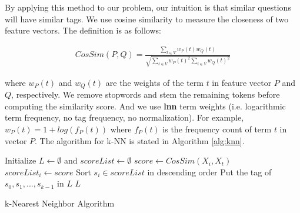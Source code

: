 By applying this method to our problem, our intuition is that similar questions will have similar tags. We use cosine similarity to measure the closeness of two feature vectors. The definition is as follows:

\begin{gather}
	CosSim(P,Q)=\frac{\sum_{t \in V}w_P(t)w_Q(t)}{\sqrt{\sum_{t \in V}w_P(t)^2 \sum_{t \in V}w_Q(t)^2}}
\end{gather}

where $w_P(t)$ and $w_Q(t)$ are the weights of the term $t$ in feature vector $P$ and $Q$, respectively. We remove stopwords and stem the remaining tokens before computing the similarity score. And we use \textbf{lnn} term weights (i.e. logarithmic term frequency, no tag frequency, no normalization). For example, $w_P(t) = 1 + log(f_P(t))$ where $f_P(t)$ is the frequency count of term $t$ in vector $P$. The algorithm for k-NN is stated in Algorithm \ref{alg:knn}.

\IncMargin{1em}
\begin{algorithm}
\label{alg:knn}
\BlankLine
Initialize $L \leftarrow \emptyset$ and $scoreList \leftarrow \emptyset$\;
 {
	$score \leftarrow CosSim(X_i, X_t)$ \;
	$scoreList_i \leftarrow score$ \;
}
Sort $s_i \in scoreList$ in descending order \; 
Put the tag of $s_0, s_1, ..., s_{k-1}$ in $L$ \;
\Return $L$\;
\caption{k-Nearest Neighbor Algorithm}\label{algo_disjdecomp}
\end{algorithm}
\DecMargin{1em}

